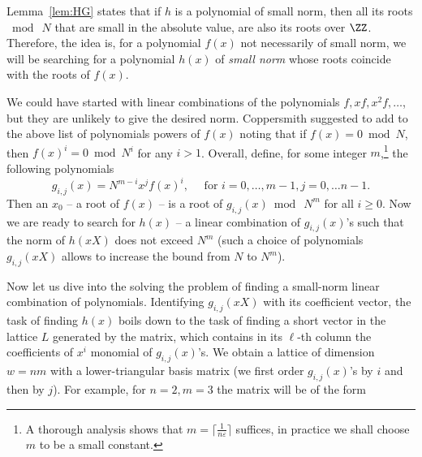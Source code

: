 \documentclass[11pt]{exam}
\theoremstyle{definition}
\begin{document}
Lemma~\ref{lem:HG} states that if $h$ is a polynomial of small norm, then all its roots $\bmod~N$ that are small in the absolute value, are also its roots over $\ZZ$. Therefore, the idea is, for a polynomial $f(x)$ not necessarily of small norm, we will be searching for a polynomial $h(x)$ of \emph{small norm} whose roots coincide with the roots of $f(x)$. 

We could have started with linear combinations of the polynomials  $f, xf, x^2f, \ldots$, but they are unlikely to give the desired norm. Coppersmith suggested to add to the above list of polynomials powers of $f(x)$ noting that if $f(x) = 0 \bmod N$, then $f(x)^i = 0 \bmod N^i$ for any $i > 1$. Overall, define, for some integer $m$,\footnote{A thorough analysis shows that $m = \lceil \frac{1}{n\varepsilon} \rceil$ suffices, in practice we shall choose $m$ to be a small constant.} the following polynomials
\[
		g_{i,j}(x) = N^{m-i}x^jf(x)^i, \quad \text{ for } i = 0, \ldots, m-1, j = 0, \ldots n-1.
	\]
Then an $x_0$ -- a root of $f(x)$ -- is a root of  $g_{i,j}(x) \bmod~N^m$ for all $i \geq 0$. Now we are ready to search for $h(x)$ -- a linear combination of $g_{i,j}(x)$'s such that the norm of $h(xX)$  does not exceed $N^m$ (such a choice of polynomials $g_{i,j}(xX)$ allows to increase the bound from $N$ to $N^m$).


Now let us dive into the solving the problem of finding a small-norm linear combination of polynomials. Identifying $g_{i,j}(xX)$ with its coefficient vector, the task of finding $h(x)$ boils down to the task of finding a short vector in the lattice $L$ generated by the matrix, which contains in its $\ell$-th column the coefficients of $x^i$ monomial of $g_{i,j}(x)$'s. We obtain a lattice of dimension  $w = nm$ with a lower-triangular basis matrix (we first order $g_{i,j}(x)$'s by $i$ and then by $j$). For example, for $n=2, m=3$ the matrix will be of the form
	
\end{document}
